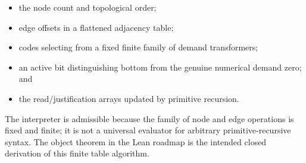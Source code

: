 \begin{itemize}
\item the node count and topological order;
\item edge offsets in a flattened adjacency table;
\item codes selecting from a fixed finite family of demand transformers;
\item an active bit distinguishing bottom from the genuine numerical demand zero; and
\item the read/justification arrays updated by primitive recursion.
\end{itemize}

The interpreter is admissible because the family of node and edge operations is fixed
and finite; it is not a universal evaluator for arbitrary primitive-recursive syntax.
The object theorem  in the Lean roadmap is the intended
closed derivation of this finite table algorithm.
